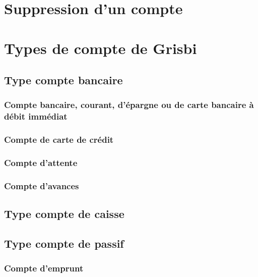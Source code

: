 \section{Suppression d'un compte\label{accounts-delete} }


\section{Types de compte de Grisbi\label{accounts-type}}

\subsection{Type compte bancaire\label{accounts-type-bank}}



\subsubsection{Compte bancaire, courant, d'épargne ou de carte bancaire à débit immédiat\label{accounts-type-bank-misc}}


\subsubsection{Compte de carte de crédit\label{accounts-type-bank-creditcard}}


\subsubsection{Compte d'attente\label{accounts-type-bank-waiting}}


\subsubsection{Compte d'avances\label{accounts-type-bank-advance}}



\subsection{Type compte de caisse\label{accounts-type-cash}}


\subsection{Type compte de passif\label{accounts-type-liabilities}}

\subsubsection{Compte d'emprunt\label{accounts-type-liabilities-loan}}


